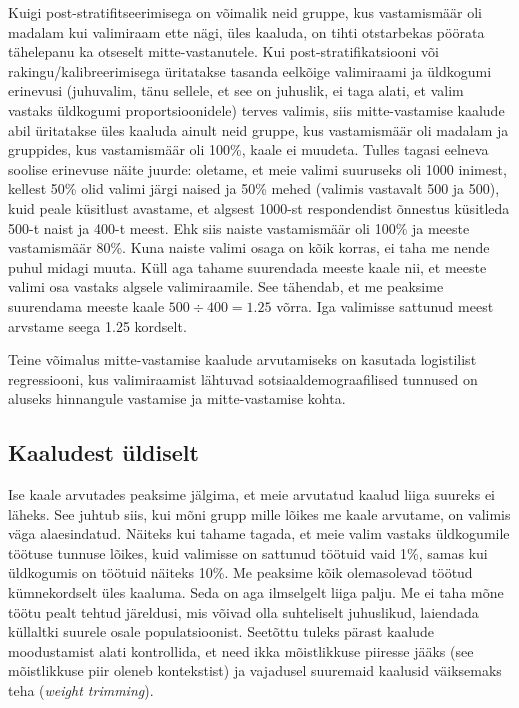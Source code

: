 \documentclass[
]{book}
\begin{document}
Kuigi post-stratifitseerimisega on võimalik neid gruppe, kus vastamismäär oli madalam kui valimiraam ette nägi, üles kaaluda, on tihti otstarbekas pöörata tähelepanu ka otseselt mitte-vastanutele. Kui post-stratifikatsiooni või rakingu/kalibreerimisega üritatakse tasanda eelkõige valimiraami ja üldkogumi erinevusi (juhuvalim, tänu sellele, et see on juhuslik, ei taga alati, et valim vastaks üldkogumi proportsioonidele) terves valimis, siis mitte-vastamise kaalude abil üritatakse üles kaaluda ainult neid gruppe, kus vastamismäär oli madalam ja gruppides, kus vastamismäär oli 100\%, kaale ei muudeta. Tulles tagasi eelneva soolise erinevuse näite juurde: oletame, et meie valimi suuruseks oli 1000 inimest, kellest 50\% olid valimi järgi naised ja 50\% mehed (valimis vastavalt 500 ja 500), kuid peale küsitlust avastame, et algsest 1000-st respondendist õnnestus küsitleda 500-t naist ja 400-t meest. Ehk siis naiste vastamismäär oli 100\% ja meeste vastamismäär 80\%. Kuna naiste valimi osaga on kõik korras, ei taha me nende puhul midagi muuta. Küll aga tahame suurendada meeste kaale nii, et meeste valimi osa vastaks algsele valimiraamile. See tähendab, et me peaksime suurendama meeste kaale \(500\div400 = 1.25\) võrra. Iga valimisse sattunud meest arvstame seega 1.25 kordselt.

Teine võimalus mitte-vastamise kaalude arvutamiseks on kasutada logistilist regressiooni, kus valimiraamist lähtuvad sotsiaaldemograafilised tunnused on aluseks hinnangule vastamise ja mitte-vastamise kohta.

\hypertarget{kaaludest-uxfcldiselt}{%
\subsection{Kaaludest üldiselt}\label{kaaludest-uxfcldiselt}}

Ise kaale arvutades peaksime jälgima, et meie arvutatud kaalud liiga suureks ei läheks. See juhtub siis, kui mõni grupp mille lõikes me kaale arvutame, on valimis väga alaesindatud. Näiteks kui tahame tagada, et meie valim vastaks üldkogumile töötuse tunnuse lõikes, kuid valimisse on sattunud töötuid vaid 1\%, samas kui üldkogumis on töötuid näiteks 10\%. Me peaksime kõik olemasolevad töötud kümnekordselt üles kaaluma. Seda on aga ilmselgelt liiga palju. Me ei taha mõne töötu pealt tehtud järeldusi, mis võivad olla suhteliselt juhuslikud, laiendada küllaltki suurele osale populatsioonist. Seetõttu tuleks pärast kaalude moodustamist alati kontrollida, et need ikka mõistlikkuse piiresse jääks (see mõistlikkuse piir oleneb kontekstist) ja vajadusel suuremaid kaalusid väiksemaks teha (\emph{weight trimming}).
\end{document}
